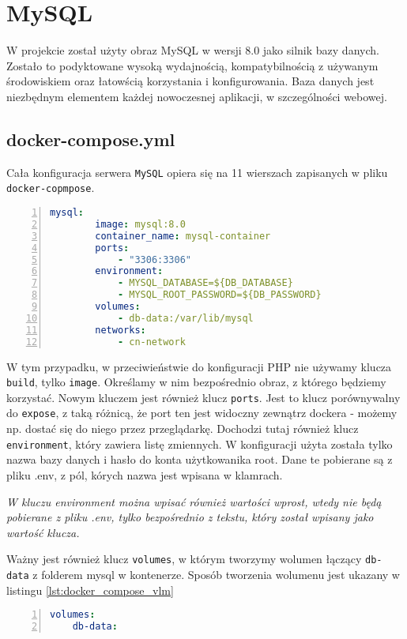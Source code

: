 \section{MySQL}
W projekcie został użyty obraz MySQL w wersji 8.0 jako silnik bazy danych. Zostało to podyktowane wysoką wydajnością, kompatybilnością z używanym środowiskiem oraz łatowścią korzystania i konfigurowania. Baza danych jest niezbędnym elementem każdej nowoczesnej aplikacji, w szczególności webowej.

\subsection{docker-compose.yml}
Cała konfiguracja serwera \verb|MySQL| opiera się na 11 wierszach zapisanych w pliku \verb|docker-copmpose|.

\begin{lstlisting}[language=yaml, caption={Konfiguracja kontenera MySQL w pliku docker-compose.yml}, label={lst:docker_compose_mysql}, numbers=left, frame=single]
    mysql:
        image: mysql:8.0
        container_name: mysql-container
        ports:
            - "3306:3306"
        environment:
            - MYSQL_DATABASE=${DB_DATABASE}
            - MYSQL_ROOT_PASSWORD=${DB_PASSWORD}
        volumes:
            - db-data:/var/lib/mysql
        networks:
            - cn-network
\end{lstlisting}

W tym przypadku, w przeciwieństwie do konfiguracji PHP nie używamy klucza \verb|build|, tylko \verb|image|. Określamy w nim bezpośrednio obraz, z którego będziemy korzystać. Nowym kluczem jest również klucz \verb|ports|. Jest to klucz porównywalny do \verb|expose|, z taką różnicą, że port ten jest widoczny zewnątrz dockera - możemy np. dostać się do niego przez przeglądarkę.
Dochodzi tutaj również klucz \verb|environment|, który zawiera listę zmiennych. W konfiguracji użyta została tylko nazwa bazy danych i hasło do konta użytkowanika root. Dane te pobierane są z pliku .env, z pól, kórych nazwa jest wpisana w klamrach.

\textit{W kluczu environment można wpisać również wartości wprost, wtedy nie będą pobierane z pliku .env, tylko bezpośrednio z tekstu, który został wpisany jako wartość klucza.}

Ważny jest również klucz \verb|volumes|, w którym tworzymy wolumen łączący \verb|db-data| z folderem mysql w kontenerze. Sposób tworzenia wolumenu jest ukazany w listingu \ref{lst:docker_compose_vlm}

\begin{lstlisting}[language=yaml, caption={Wolumen db-data w pliku docker-compose.yml}, label={lst:docker_compose_vlm}, numbers=left, frame=single]
volumes:
    db-data:
\end{lstlisting}
